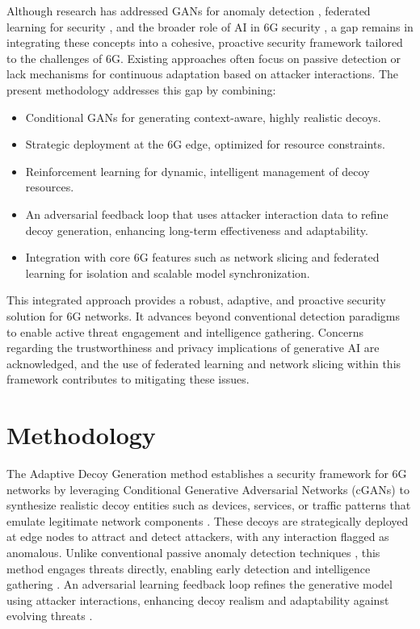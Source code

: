 \documentclass{article}
\begin{document}
Although research has addressed GANs for anomaly detection \cite{Park2023AnEAD, Rao2024AIDAG, Gonzalez2020OnTUJ}, federated learning for security \cite{Das2022FGANFGI}, and the broader role of AI in 6G security \cite{Siriwardhana2021AIA6W, Ferrag2023GenerativeAFB}, a gap remains in integrating these concepts into a cohesive, proactive security framework tailored to the challenges of 6G. Existing approaches often focus on passive detection or lack mechanisms for continuous adaptation based on attacker interactions. The present methodology addresses this gap by combining:
\begin{itemize}
    \item Conditional GANs for generating context-aware, highly realistic decoys.
    \item Strategic deployment at the 6G edge, optimized for resource constraints.
    \item Reinforcement learning for dynamic, intelligent management of decoy resources.
    \item An adversarial feedback loop that uses attacker interaction data to refine decoy generation, enhancing long-term effectiveness and adaptability.
    \item Integration with core 6G features such as network slicing and federated learning for isolation and scalable model synchronization.
\end{itemize}
This integrated approach provides a robust, adaptive, and proactive security solution for 6G networks. It advances beyond conventional detection paradigms to enable active threat engagement and intelligence gathering. Concerns regarding the trustworthiness and privacy implications of generative AI \cite{Li2024TrustworthyACO, Feretzakis2024PrivacyPreservingTIAG} are acknowledged, and the use of federated learning and network slicing within this framework contributes to mitigating these issues.

\section{Methodology}

The Adaptive Decoy Generation method establishes a security framework for 6G networks by leveraging Conditional Generative Adversarial Networks (cGANs) to synthesize realistic decoy entities such as devices, services, or traffic patterns that emulate legitimate network components \cite{Ayanoglu2022MachineLIA, Park2023AnEAD}. These decoys are strategically deployed at edge nodes to attract and detect attackers, with any interaction flagged as anomalous. Unlike conventional passive anomaly detection techniques \cite{Saeed2023AnomalyDIY}, this method engages threats directly, enabling early detection and intelligence gathering \cite{Ferrag2023GenerativeAFB}. An adversarial learning feedback loop refines the generative model using attacker interactions, enhancing decoy realism and adaptability against evolving threats \cite{Vemuri2024AdaptiveGAM}.
\end{document}
